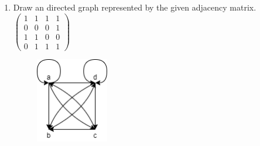 \documentclass[a4paper]{article}
\begin{document}
\begin{enumerate}
\begin{enumerate}[label=\textbf{\alph*)}]
\begin{minipage}{0.3\textwidth}
				            $\begin{blockarray}{ccccc}
						            & a & b & c & d \\
						            \begin{block}{c(cccc)}
							            a & 1 & 1 & 1 & 1 \\
							            b & 0 & 0 & 0 & 1 \\
							            c & 1 & 1 & 0 & 0 \\
							            d & 0 & 1 & 1 & 1 \\
						            \end{block}
					            \end{blockarray}$
			            \end{minipage}
			            \begin{minipage}{0.5\textwidth}
				            Incidence matrix:\\
				            $\begin{blockarray}{ccccccccccc}
						            & e1 & e2 & e3 & e4 & e5 & e6 & e7 & e8 & e9 & e10 \\
						            \begin{block}{c(cccccccccc)}
							            a & 1 & -1 & -1 & 0 & 1 & -1 & 0 & 0 & 0 & 0 \\
							            b & 0 & 1 & 0 & 1 & 0 & 0 & 1 & -1 & 0 & 0 \\
							            c & 0 & 0 & 0 & -1 & -1  & 1 & 0 & 0 & 1 & 0 \\
							            d & 0 & 0 & 1 & 0 & 0 & 0 & -1 & 1 & -1 & 1 \\
						            \end{block}
					            \end{blockarray}$
			            \end{minipage}
		      \end{enumerate}
		\item Draw an directed graph represented by the given adjacency matrix.
		      $\begin{pmatrix}
				      1 & 1 & 1 & 1 \\
				      0 & 0 & 0 & 1 \\
				      1 & 1 & 0 & 0 \\
				      0 & 1 & 1 & 1
			      \end{pmatrix}$ \\
		      \begin{figure}[H]
			      \centering
			      \includegraphics[width=0.3\textwidth]{gprob3_4.png}

\end{figure}
\end{enumerate}
\end{document}
